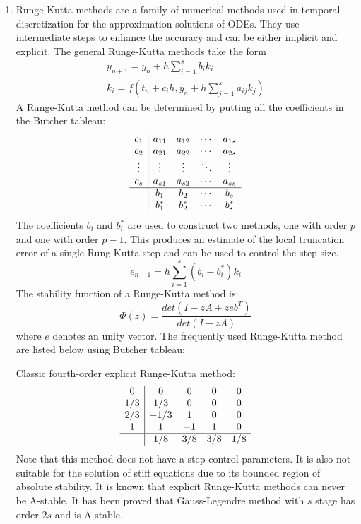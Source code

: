 \begin{enumerate}
\item Runge-Kutta methods are a family of numerical methods used in temporal discretization for the approximation solutions of ODEs. They use intermediate steps to enhance the accuracy and can be either implicit and explicit. The general Runge-Kutta methods take the form 
\begin{eqnarray}
y_{n+1} = y_n + h\sum_{i=1}^sb_ik_i\\
k_i = f(t_n+c_ih, y_n + h\sum_{j=1}^{s}a_{ij}k_j)
\end{eqnarray}
A Runge-Kutta method can be determined by putting all the coefficients in the Butcher tableau\cite{Butcher2003Numerical}:
\begin{equation}
\begin{array}{c|cccc}
c_1 & a_{11} & a_{12} & \cdots & a_{1s} \\
c_2 & a_{21} & a_{22} & \cdots & a_{2s} \\
\vdots & \vdots & \vdots & \ddots & \vdots\\
c_s & a_{s1} & a_{s2} & \cdots & a_{ss}\\
\hline
& b_1 & b_2 & \cdots & b_s\\
& b_1^* & b_2^* &\cdots & b_s^*
\end{array}
\end{equation}
The coefficients $b_i$ and $b_i^*$ are used to construct two methods, one with
order $p$ and one with order $p-1$. This produces an estimate of the local truncation 
error of a single Rung-Kutta step and can be used to control the step size.
\begin{equation}
e_{n+1} = h\sum_{i=1}^s(b_i-b_i^*)k_i
\end{equation}
The stability function of a Runge-Kutta method is:
\begin{equation}
\Phi(z) = \frac{det(I-zA+zeb^T)}{det(I-zA)}
\label{rk_stab_func}
\end{equation}
where $e$ denotes an unity vector.
The frequently used Runge-Kutta method are listed below using Butcher tableau:

Classic fourth-order explicit Runge-Kutta method:
\begin{equation}
\begin{array}{c|cccc}
0   & 0   & 0   & 0 & 0\\
1/3 & 1/3 & 0   & 0 & 0\\
2/3 & -1/3   & 1 & 0 & 0\\
1   & 1   & -1   & 1 & 0\\
\hline
& 1/8 & 3/8 & 3/8 & 1/8
\end{array}
\end{equation}
Note that this method does not have a step control parameters. It is also not suitable for the solution of stiff equations due to its bounded region of absolute stability. It is known that explicit Runge-Kutta methods can never be A-stable. It has been proved that Gauss-Legendre method with $s$ stage has order $2s$ and is A-stable.


\end{enumerate}
